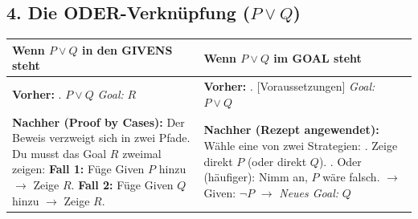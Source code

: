 \documentclass{article}
\begin{document}
\newpage

\subsection*{4. Die ODER-Verknüpfung ($P \lor Q$)}
\begin{center}
\small
\begin{tabular}{ L{0.45\textwidth} | L{0.45\textwidth} }
\toprule
\textbf{Wenn $P \lor Q$ in den GIVENS steht} & \textbf{Wenn $P \lor Q$ im GOAL steht} \\
\midrule
\textbf{Vorher:} . $P \lor Q$ \newline
\emph{Goal:} $R$ &
\textbf{Vorher:} . [Voraussetzungen] \newline
\emph{Goal:} $P \lor Q$ \\
\hline
\textbf{Nachher (Proof by Cases):} \newline
Der Beweis verzweigt sich in zwei Pfade. Du musst das Goal $R$ zweimal zeigen: \newline
\textbf{Fall 1:} Füge Given $P$ hinzu $\rightarrow$ Zeige $R$. \newline
\textbf{Fall 2:} Füge Given $Q$ hinzu $\rightarrow$ Zeige $R$. &
\textbf{Nachher (Rezept angewendet):} \newline
Wähle eine von zwei Strategien: . Zeige direkt $P$ (oder direkt $Q$). . Oder (häufiger): Nimm an, $P$ wäre falsch. \newline
$\rightarrow$ Given: $\neg P$ \newline
$\rightarrow$ \emph{Neues Goal:} $Q$ \\
\bottomrule
\end{tabular}
\end{center}
\end{document}
